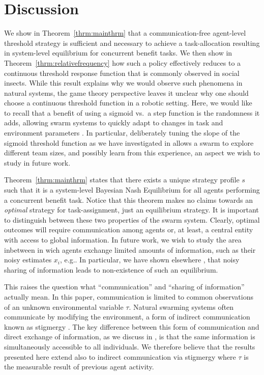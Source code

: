 \documentclass[conference]{ieeeconf}
\begin{document}
\section{Discussion}\label{sec:disc}
We show in Theorem~\ref{thrm:mainthrm} that a communication-free agent-level threshold strategy is sufficient and necessary to achieve a task-allocation resulting in system-level equilibrium for concurrent benefit tasks. We then show in Theorem~\ref{thrm:relativefrequency} how such a policy effectively reduces to a continuous threshold response function that is commonly observed in social insects. While this result explains why we would observe such phenomena in natural systems, the game theory perspective leaves it unclear why one should choose a continuous threshold function in a robotic setting. Here, we would like to recall that a benefit of using a sigmoid vs.\ a step function is the randomness it adds, allowing swarm systems to quickly adapt to changes in task and environment parameters \cite{Bonabeau1997}. In particular, deliberately tuning the slope of the sigmoid threshold function as we have investigated in \cite{Kanakia2014} allows a swarm to explore different team sizes, and possibly learn from this experience, an aspect we wish to study in future work. 

Theorem~\ref{thrm:mainthrm} states that there exists a unique strategy profile $s$ such that it is a system-level Bayesian Nash Equilibrium for all agents performing a concurrent benefit task. Notice that this theorem makes no claims towards an \emph{optimal} strategy for task-assignment, just an equilibrium strategy. It is important to distinguish between these two properties of the swarm system. Clearly, optimal outcomes will require communication among agents or, at least, a central entity with access to global information. In future work, we wish to study the area inbetween in wich agents exchange limited amounts of information, such as their noisy estimates $x_i$, e.g.. In particular, we have shown elsewhere \cite{Touri2014}, that noisy sharing of information leads to non-existence of such an equilibrium.

This raises the question what ``communication'' and ``sharing of information'' actually mean. In this paper, communication is limited to common observations of an unknown environmental variable $\tau$. Natural swarming systems often communicate by modifying the environment, a form of indirect communication known as stigmergy \cite{grasse1959reconstruction}. The key difference between this form of communication and direct exchange of information, as we discuss in \cite{Touri2014}, is that the same information is simultaneously accessible to all individuals. We therefore believe that the results presented here extend also to indirect communication via stigmergy where $\tau$ is the measurable result of previous agent activity.
\end{document}

